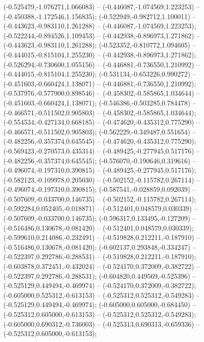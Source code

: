  (-0.525479,-1.076271,1.066083) -- (-0.446087,-1.074569,1.223253) -- (-0.450388,-1.172546,1.156835);
 (-0.522949,-0.982712,1.100011) -- (-0.443623,-0.983110,1.261288) -- (-0.446087,-1.074569,1.223253);
 (-0.522244,-0.894526,1.109453) -- (-0.442938,-0.896973,1.271862) -- (-0.443623,-0.983110,1.261288);
 (-0.523352,-0.810772,1.094605) -- (-0.444015,-0.815104,1.255230) -- (-0.442938,-0.896973,1.271862);
 (-0.526294,-0.730600,1.055156) -- (-0.446881,-0.736550,1.210992) -- (-0.444015,-0.815104,1.255230);
 (-0.531134,-0.653226,0.990272) -- (-0.451603,-0.660424,1.138071) -- (-0.446881,-0.736550,1.210992);
 (-0.537976,-0.577900,0.898546) -- (-0.458302,-0.585865,1.034644) -- (-0.451603,-0.660424,1.138071);
 (-0.546386,-0.503285,0.784478) -- (-0.466571,-0.511502,0.905803) -- (-0.458302,-0.585865,1.034644);
 (-0.554534,-0.427134,0.668185) -- (-0.474620,-0.435312,0.775290) -- (-0.466571,-0.511502,0.905803);
 (-0.562229,-0.349487,0.551654) -- (-0.482256,-0.357374,0.645545) -- (-0.474620,-0.435312,0.775290);
 (-0.569423,-0.270573,0.435314) -- (-0.489425,-0.277945,0.517176) -- (-0.482256,-0.357374,0.645545);
 (-0.576070,-0.190646,0.319616) -- (-0.496074,-0.197310,0.390815) -- (-0.489425,-0.277945,0.517176);
 (-0.582123,-0.109978,0.205030) -- (-0.502152,-0.115782,0.267114) -- (-0.496074,-0.197310,0.390815);
 (-0.587541,-0.028859,0.092039) -- (-0.507609,-0.033700,0.146735) -- (-0.502152,-0.115782,0.267114);
 (-0.592284,0.052405,-0.018871) -- (-0.512401,0.048579,0.030339) -- (-0.507609,-0.033700,0.146735);
 (-0.596317,0.133495,-0.127209) -- (-0.516486,0.130678,-0.081420) -- (-0.512401,0.048579,0.030339);
 (-0.599610,0.214086,-0.232491) -- (-0.519828,0.212211,-0.187910) -- (-0.516486,0.130678,-0.081420);
 (-0.602137,0.293848,-0.334247) -- (-0.522397,0.292786,-0.288531) -- (-0.519828,0.212211,-0.187910);
 (-0.603878,0.372451,-0.432024) -- (-0.524170,0.372009,-0.382722) -- (-0.522397,0.292786,-0.288531);
 (-0.604820,0.449569,-0.525396) -- (-0.525129,0.449494,-0.469974) -- (-0.524170,0.372009,-0.382722);
 (-0.605000,0.525312,-0.613153) -- (-0.525312,0.525312,-0.549283) -- (-0.525129,0.449494,-0.469974);
 (-0.605000,0.605000,-0.684450) -- (-0.525312,0.605000,-0.613153) -- (-0.525312,0.525312,-0.549283);
 (-0.605000,0.690312,-0.736003) -- (-0.525313,0.690313,-0.659336) -- (-0.525312,0.605000,-0.613153);
